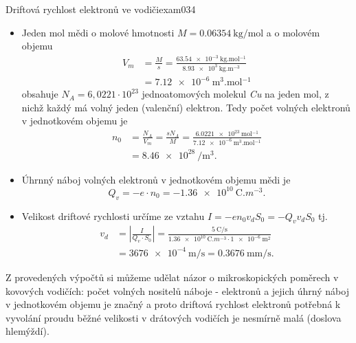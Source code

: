 \begin{fyzexam}{Driftová rychlost elektronů ve vodiči}{exam034}
  \begin{itemize}[leftmargin=2em]
    \item Jeden mol mědi o molové hmotnosti $M = \qty{0.06354}{\kg\per\mol}$ a o molovém
          objemu 
          \begin{align*}
            V_m &= \frac{M}{s} 
                 = \frac{\qty{63.54e-3}{\kg.\mol^{-1}}}{\qty{8.93e3}{\kg.\m^{-3}}}      \\
                &= \qty{7.12e-6}{\m^3.\mol^{-1}}
          \end{align*}
          obsahuje $N_A = 6,0221\cdot10^{23}$ jednoatomových molekul \emph{Cu} na jeden mol,
          z nichž každý má volný jeden (valenční) elektron. Tedy počet volných elektronů v
          jednotkovém objemu je 
          \begin{align*}
            n_0 &= \frac{N_A}{V_m} = \frac{sN_A}{M}                                           
                 = \frac{\qty{6.0221e23}{\mol^{-1}}}{\qty{7.12e-6}{\m^{3}.\mol^{-1}}}    \\
                &= \qty{8.46e28}{\per\cubic\m}.
          \end{align*}  
    \item Úhrnný náboj volných elektronů v jednotkovém objemu mědi je 
          \begin{equation}
            Q_v = -e\cdot n_0 = \qty{-1.36e10}{\coulomb.m^{-3}}.
          \end{equation}
    \item Velikost driftové rychlosti určíme ze vztahu $I = -en_0v_dS_0 = - Q_v v_d S_0$ tj.
    \begin{align*}
      v_d &= \left\lvert\frac{I}{Q_v\cdot S_0}\right\rvert                       
           = \frac{\qty{5}{\coulomb\per\s}}{\qty{1.36e10}{\coulomb.m^{-3}}\cdot\qty{1e-6}{\m^2}}  \\
          &= \qty{3676e-4}{\m\per\s} = \qty{0.3676}{\mm\per\s}.  
    \end{align*}
  \end{itemize}
  Z provedených výpočtů si můžeme udělat názor o mikroskopických poměrech v kovových vodičích: počet
  volných nositelů náboje - elektronů a jejich úhrný náboj v jednotkovém objemu je značný a proto
  driftová rychlost elektronů potřebná k vyvolání proudu běžné velikosti v drátových vodičích je
  nesmírně malá (doslova hlemýždí).
\end{fyzexam}
